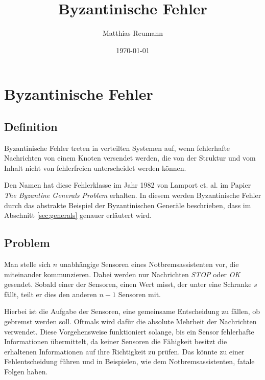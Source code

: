 \documentclass{article}
\title{Byzantinische Fehler}
\author{Matthias Reumann}
\date{\today}
\begin{document}
\maketitle

\newpage

\tableofcontents

\newpage

\iffalse
\section{Byzantinische Fehler}

\subsection{Definition}

Byzantinische Fehler treten in verteilten Systemen auf, 
wenn fehlerhafte Nachrichten von einem Knoten versendet werden, 
die von der Struktur und vom Inhalt nicht von fehlerfreien
unterscheidet werden können. \cite{esraberlin} 

\medskip 

Den Namen hat diese Fehlerklasse im Jahr 1982 von Lamport et. al. im 
Papier \textit{The Byzantine Generals Problem} erhalten.\cite{generals}
In diesem werden Byzantinische Fehler durch das abstrakte Beispiel 
der Byzantinischen Generäle beschrieben, dass im Abschnitt \ref{sec:generals} genauer erläutert wird.

\subsection{Problem}

Man stelle sich $n$ unabhängige Sensoren eines Notbremsassistenten vor, die miteinander kommunzieren.
Dabei werden nur Nachrichten \textit{STOP} oder \textit{OK} gesendet. Sobald einer der Sensoren, 
einen Wert misst, der unter eine Schranke $s$ fällt, teilt er dies den anderen $n-1$ Sensoren mit.

\medskip 

Hierbei ist die Aufgabe der Sensoren, eine gemeinsame Entscheidung zu fällen, ob gebremst werden soll. 
Oftmals wird dafür die absolute Mehrheit der Nachrichten verwendet. Diese Vorgehensweise funktioniert 
solange, bis ein Sensor fehlerhafte Informationen übermittelt, da keiner Sensoren die Fähigkeit besitzt die 
erhaltenen Informationen auf ihre Richtigkeit zu prüfen. Das könnte zu einer Fehlentscheidung führen 
und in Beispielen, wie dem Notbremsassistenten, fatale Folgen haben. 
\end{document}

